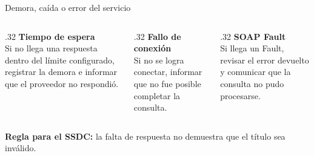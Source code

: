 \begin{frame}[t]{Demora, caída o error del servicio}

\begin{columns}[T,onlytextwidth]
\begin{column}{.32\textwidth}
{\color{ambar}\bfseries Tiempo de espera}\\[2mm]
Si no llega una respuesta dentro del límite configurado, registrar la demora e informar que el proveedor no respondió.
\end{column}

\begin{column}{.32\textwidth}
{\color{ambar}\bfseries Fallo de conexión}\\[2mm]
Si no se logra conectar, informar que no fue posible completar la consulta.
\end{column}

\begin{column}{.32\textwidth}
{\color{ambar}\bfseries SOAP Fault}\\[2mm]
Si llega un Fault, revisar el error devuelto y comunicar que la consulta no pudo procesarse.
\end{column}
\end{columns}

\medskip
\colorbox{suave}{\parbox{.96\linewidth}{
\smallskip
\textbf{\color{acento}Regla para el SSDC:}
la falta de respuesta no demuestra que el título sea inválido.
\smallskip
}}

\medskip
{}
\end{frame}
